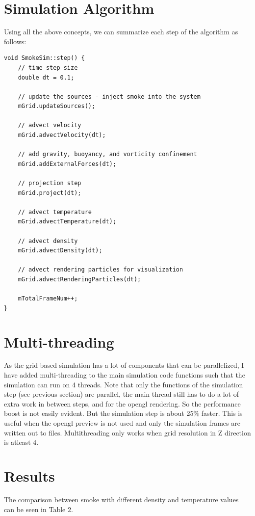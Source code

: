 \documentclass[a4paper,11pt]{article}
\theoremstyle{mytheor}
\begin{document}
\section*{Simulation Algorithm}

Using all the above concepts, we can summarize each step of the algorithm as follows:
\begin{lstlisting}
void SmokeSim::step() {
    // time step size
    double dt = 0.1;
    
    // update the sources - inject smoke into the system
    mGrid.updateSources();
    
    // advect velocity
    mGrid.advectVelocity(dt);
    
    // add gravity, buoyancy, and vorticity confinement
    mGrid.addExternalForces(dt);
    
    // projection step
    mGrid.project(dt);
    
    // advect temperature
    mGrid.advectTemperature(dt);
    
    // advect density
    mGrid.advectDensity(dt);
    
    // advect rendering particles for visualization
    mGrid.advectRenderingParticles(dt);
    
    mTotalFrameNum++;
}
\end{lstlisting}


\section*{Multi-threading}

As the grid based simulation has a lot of components that can be parallelized, I have added multi-threading to the main simulation code functions such that the simulation can run on 4 threads. Note that only the functions of the simulation step (see previous section) are parallel, the main thread still has to do a lot of extra work in between steps, and for the opengl rendering. So the performance boost is not easily evident. But the simulation step is about 25\% faster. This is useful when the opengl preview is not used and only the simulation frames are written out to files. Multithreading only works when grid resolution in Z direction is atleast 4.


\section*{Results}

The comparison between smoke with different density and temperature values can be seen in Table 2. 
\end{document}
